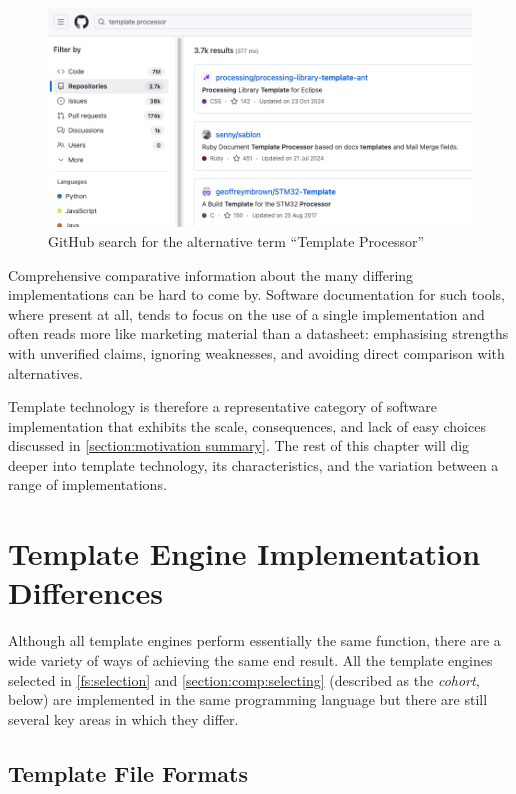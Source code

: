 \begin{figure}[ht!]
\centering
\includegraphics[width=\columnwidth]{Figures/template-processor.png}
\caption{GitHub search for the alternative term \enquote{Template Processor}}
\label{github:processor}
\end{figure}


Comprehensive comparative information about the many differing implementations can be hard to come by. Software documentation for such tools, where present at all, tends to focus on the use of a single implementation and often reads more like marketing material than a datasheet: emphasising strengths with unverified claims, ignoring weaknesses, and avoiding direct comparison with alternatives.

Template technology is therefore a representative category of software implementation that exhibits the scale, consequences, and lack of easy choices discussed in \autoref{section:motivation summary}. The rest of this chapter will dig deeper into template technology, its characteristics, and the variation between a range of implementations.

\section{Template Engine Implementation Differences}
\label{section:comp:languages}

Although all \gls{template engine}s perform essentially the same function, there are a wide variety of ways of achieving the same end result. All the \gls{template engine}s selected in \autoref{fs:selection} and  \autoref{section:comp:selecting} (described as the \emph{cohort}, below) are implemented in the same \gls{programming language} but there are still several key areas in which they differ.

\subsection{Template File Formats}

